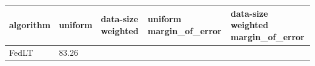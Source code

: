 \begin{tabular}{lllll}
\toprule
algorithm & uniform & data-size weighted & uniform margin_of_error & data-size weighted margin_of_error \\
\midrule
FedLT & 83.26%
\bottomrule
\end{tabular}
